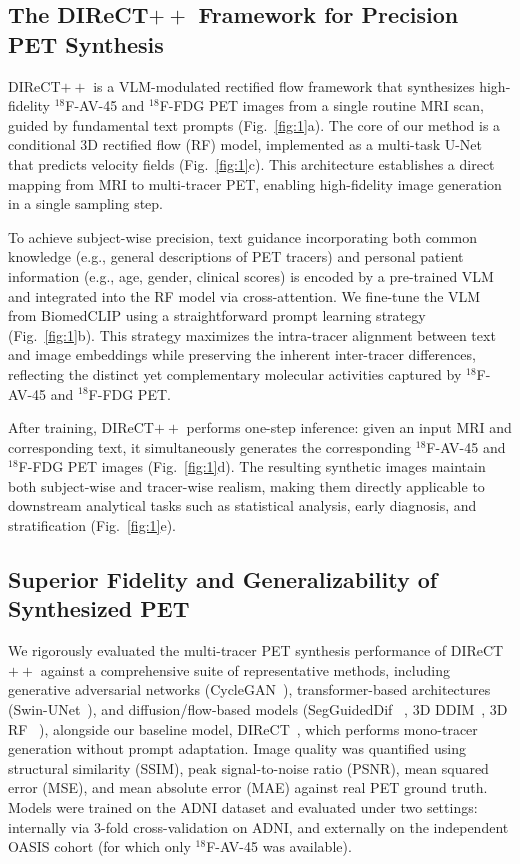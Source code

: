 \documentclass[a4paper]{cas-sc}
\begin{document}
\subsection{The DIReCT$++$ Framework for Precision PET Synthesis}
DIReCT$++$ is a VLM-modulated rectified flow framework that synthesizes high-fidelity $^{18}$F-AV-45 and $^{18}$F-FDG PET images from a single routine MRI scan, guided by fundamental text prompts (Fig.~\ref{fig:1}a). The core of our method is a conditional 3D rectified flow (RF) model, implemented as a multi-task U-Net that predicts velocity fields (Fig.~\ref{fig:1}c). This architecture establishes a direct mapping from MRI to multi-tracer PET, enabling high-fidelity image generation in a single sampling step.

To achieve subject-wise precision, text guidance incorporating both common knowledge (e.g., general descriptions of PET tracers) and personal patient information (e.g., age, gender, clinical scores) is encoded by a pre-trained VLM and integrated into the RF model via cross-attention. We fine-tune the VLM from BiomedCLIP using a straightforward prompt learning strategy (Fig.~\ref{fig:1}b). This strategy maximizes the intra-tracer alignment between text and image embeddings while preserving the inherent inter-tracer differences, reflecting the distinct yet complementary molecular activities captured by $^{18}$F-AV-45 and $^{18}$F-FDG PET.

After training, DIReCT$++$ performs one-step inference: given an input MRI and corresponding text, it simultaneously generates the corresponding $^{18}$F-AV-45 and $^{18}$F-FDG PET images (Fig.~\ref{fig:1}d). The resulting synthetic images maintain both subject-wise and tracer-wise realism, making them directly applicable to downstream analytical tasks such as statistical analysis, early diagnosis, and stratification (Fig.~\ref{fig:1}e).


\subsection{Superior Fidelity and Generalizability of Synthesized PET}
We rigorously evaluated the multi-tracer PET synthesis performance of DIReCT$++$ against a comprehensive suite of representative methods, including generative adversarial networks (CycleGAN~\citep{zhu2017unpaired}), transformer-based architectures (Swin-UNet~\citep{Cao2021swin}), and diffusion/flow-based models (SegGuidedDif ~\citep{konz2024anatomically}, 3D DDIM~\citep{Graf2023}, 3D RF ~\citep{Xing2022}), alongside our baseline model, DIReCT~\citep{liu2025direct}, which performs mono-tracer generation without prompt adaptation. Image quality was quantified using structural similarity (SSIM), peak signal-to-noise ratio (PSNR), mean squared error (MSE), and mean absolute error (MAE) against real PET ground truth. 
Models were trained on the ADNI dataset and evaluated under two settings: internally via 3-fold cross-validation on ADNI, and externally on the independent OASIS cohort (for which only $^{18}$F-AV-45 was available).
\end{document}
